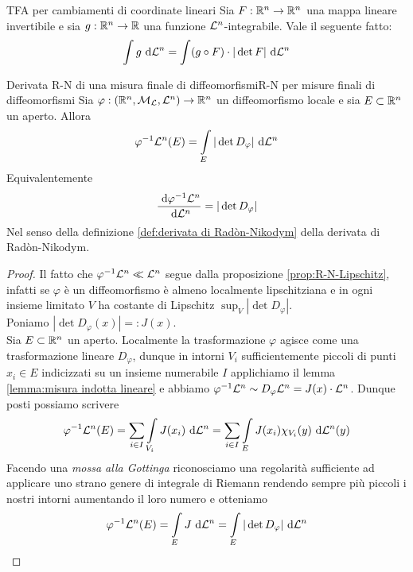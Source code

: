 \documentclass{article}
\begin{document}
\begin{theorem}{TFA per cambiamenti di coordinate lineari}{}
    Sia $F : \mathbb{R}^n \to \mathbb{R}^n$ una mappa lineare invertibile e sia $g: \mathbb{R}^n \to \mathbb{R}$ una funzione $\mathcal{L}^n$-integrabile. Vale il seguente fatto:
    \[\int\limits g \text{ d} \mathcal{L}^n = \int\limits (g \circ F) \cdot |\det F| \text{ d} \mathcal{L}^n \] 
\end{theorem}


\begin{theorem}{Derivata R-N di una misura finale di diffeomorfismi}{R-N per misure finali di diffeomorfismi}
    Sia $\varphi : (\mathbb{R}^n, \mathcal{M}_{\mathcal{L}}, \mathcal{L}^n) \to \mathbb{R}^n$ un diffeomorfismo locale e sia $E \subset \mathbb{R}^n$ un aperto. Allora 
    \[\varphi^{-1}\mathcal{L}^n(E) = \int\limits_E|\det D_\varphi|\text{ d} \mathcal{L}^n\]
    Equivalentemente
    \[\frac{\text{ d} \varphi^{-1} \mathcal{L}^n}{\text{ d} \mathcal{L}^n} = |\det D_\varphi|\]
    Nel senso della definizione \ref{def:derivata di Radòn-Nikodym} della derivata di Radòn-Nikodym.
    \begin{proof}
        Il fatto che $\varphi^{-1}\mathcal{L}^n \ll \mathcal{L}^n$ segue dalla proposizione \ref{prop:R-N-Lipschitz}, infatti se $\varphi$ è un diffeomorfismo è almeno localmente lipschitziana e in ogni insieme limitato $V$ ha costante di Lipschitz $\sup_V |\det D_\varphi|$.\\
        Poniamo $|\det D_\varphi(x)| =: J(x)$.\\
        Sia $E\subset \mathbb{R}^n$ un aperto. Localmente la trasformazione $\varphi$ agisce come una trasformazione lineare $D_\varphi$, dunque in intorni $V_i$ sufficientemente piccoli di punti $x_i\in E$ indicizzati su un insieme numerabile $I$ applichiamo il lemma \ref{lemma:misura indotta lineare} e abbiamo $\varphi^{-1} \mathcal{L}^n \sim D_\varphi \mathcal{L}^n = J(x)\cdot \mathcal{L}^n$. Dunque posti possiamo scrivere
        \[\varphi^{-1}\mathcal{L}^n(E) = \sum_{i \in I} \int\limits_{V_i} J(x_i)\text{ d} \mathcal{L}^n = \sum_{i \in I} \int\limits_E J(x_i) \chi_{V_i}(y)\text{ d} \mathcal{L}^n(y)\]
        Facendo una \textit{mossa alla Gottinga} riconosciamo una regolarità sufficiente ad applicare uno strano genere di integrale di Riemann rendendo sempre più piccoli i nostri intorni aumentando il loro numero e otteniamo
        \[\varphi^{-1}\mathcal{L}^n(E) = \int\limits_E J \text{ d} \mathcal{L}^n = \int\limits_E |\det D_\varphi|\text{ d} \mathcal{L}^n\]
    \end{proof} 
\end{theorem}
\end{document}
